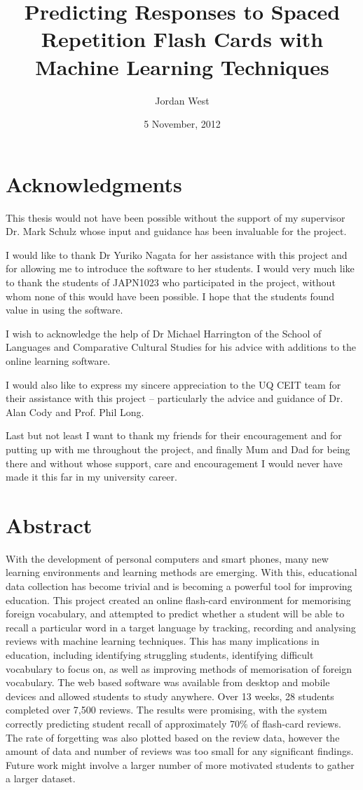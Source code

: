 \documentclass[12pt,a4paper,twoside,openright]{book}
\title{Predicting Responses to Spaced Repetition Flash Cards with Machine Learning Techniques}
\date{5 November, 2012}
\author{Jordan West}
\begin{document}
\frontmatter


\cleardoublepage



\chapter*{Acknowledgments}
This thesis would not have been possible without the support of my
supervisor Dr. Mark Schulz whose input and guidance
has been invaluable for the project.

I would like to thank Dr Yuriko Nagata for her assistance with this project and for allowing
me to introduce the software to her students. I would very much like to thank the students
of JAPN1023 who participated in the project, without whom none of this would have been possible.
I hope that the students found value in using the software.

I wish to acknowledge the help of Dr Michael Harrington of the School of Languages
and Comparative Cultural Studies
for his advice with additions to the online learning software.

I would also like to express my sincere appreciation to the UQ CEIT team for their
assistance with this project --
particularly the advice and guidance of Dr. Alan Cody and Prof. Phil Long.

Last but not least I want to thank my friends for their encouragement and
for putting up with me throughout the project, and finally Mum and Dad for being there
and without whose support, care and encouragement I would never have made it this far in
my university career.

\chapter*{Abstract}
With the development of personal computers and smart phones, many new learning environments 
and learning methods are emerging. With this, educational data collection has become
 trivial and is becoming a powerful tool for improving education. This project created
 an online flash-card environment for memorising foreign vocabulary, and attempted to 
 predict whether a student will be able to recall a particular word in a target language 
 by tracking, recording and analysing reviews with machine learning techniques. 
This has many implications in education, including identifying struggling students,
identifying difficult
vocabulary to focus on, as well as improving methods of memorisation of foreign
vocabulary.
 The web based software was available from desktop and mobile devices and allowed
 students to study anywhere. Over 13 weeks, 28 students 
 completed over 7,500 reviews. The results were promising, with the system correctly 
predicting student recall of approximately 70\% of flash-card reviews. The rate of forgetting was
also plotted based on the review data, however the amount of data and number of 
reviews was too small
for any significant findings. Future work might involve a larger number of more motivated
students to gather a larger dataset.
\end{document}
